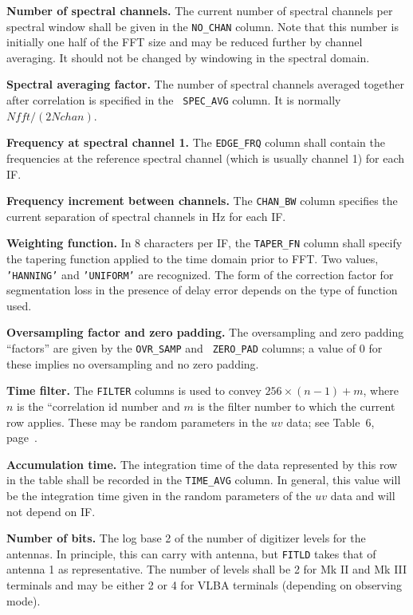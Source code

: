 \documentclass[twoside]{article}
\begin{document}
{\bf Number of spectral channels.}  The current number of spectral
channels per spectral window shall be given in the {\tt NO\_CHAN}
column.  Note that this number is initially one half of the FFT size
and may be reduced further by channel averaging.  It should not be
changed by windowing in the spectral domain.

{\bf Spectral averaging factor.}  The number of spectral channels
averaged together after correlation is specified in the {\tt
  SPEC\_AVG} column.  It is normally $Nfft / (2 Nchan)$.

{\bf Frequency at spectral channel 1.}  The {\tt EDGE\_FRQ} column
shall contain the frequencies at the reference spectral channel (which
is usually channel 1) for each IF\@.

{\bf Frequency increment between channels.}  The {\tt CHAN\_BW} column
specifies the current separation of spectral channels in Hz for each
IF\@.

{\bf Weighting function.}  In 8 characters per IF, the {\tt TAPER\_FN}
column shall specify the tapering function applied to the time domain
prior to FFT\@.  Two values, {\tt 'HANNING'} and {\tt 'UNIFORM'} are
recognized.  The form of the correction factor for segmentation loss
in the presence of delay error depends on the type of function used.

{\bf Oversampling factor and zero padding.} The oversampling and zero
padding ``factors'' are given by the {\tt OVR\_SAMP} and {\tt
  ZERO\_PAD} columns; a value of 0 for these implies no oversampling
and no zero padding.

{\bf Time filter.}  The {\tt FILTER} columns is used to convey
$ 256 \times (n-1) + m$, where $n$ is the ``correlation id number and
$m$ is the filter number to which the current row applies.  These may
be random parameters in the $uv$ data; see Table~6,
page~\pageref{ta:UVcols}.

{\bf Accumulation time.} The integration time of the data represented
by this row in the table shall be recorded in the {\tt TIME\_AVG}
column.  In general, this value will be the integration time given in
the random parameters of the $uv$ data and will not depend on IF\@.

{\bf Number of bits.}  The log base 2 of the number of digitizer
levels for the antennas.  In principle, this can carry with antenna,
but {\tt FITLD} takes that of antenna 1 as representative.  The number
of levels shall be 2 for Mk II and Mk III terminals and may be either
2 or 4 for VLBA terminals (depending on observing mode).
\end{document}
